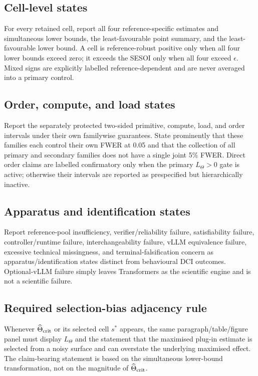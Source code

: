 \documentclass[11pt,a4paper]{article}
\begin{document}
\subsection{Cell-level states}
For every retained cell, report all four reference-specific estimates and simultaneous lower bounds, the least-favourable point summary, and the least-favourable lower bound. A cell is reference-robust positive only when all four lower bounds exceed zero; it exceeds the SESOI only when all four exceed $\epsilon$. Mixed signs are explicitly labelled reference-dependent and are never averaged into a primary control.

\subsection{Order, compute, and load states}
Report the separately protected two-sided primitive, compute, load, and order intervals under their own familywise guarantees. State prominently that these families each control their own FWER at 0.05 and that the collection of all primary and secondary families does not have a single joint 5\% FWER. Direct order claims are labelled confirmatory only when the primary $L_\Theta>0$ gate is active; otherwise their intervals are reported as prespecified but hierarchically inactive.

\subsection{Apparatus and identification states}
Report reference-pool insufficiency, verifier/reliability failure, satisfiability failure, controller/runtime failure, interchangeability failure, vLLM equivalence failure, excessive technical missingness, and terminal-falsification concern as apparatus/identification states distinct from behavioural DCI outcomes. Optional-vLLM failure simply leaves Transformers as the scientific engine and is not a scientific failure.

\subsection{Required selection-bias adjacency rule}
Whenever $\widehat\Theta_{\rm crit}$ or its selected cell $s^\ast$ appears, the same paragraph/table/figure panel must display $L_\Theta$ and the statement that the maximised plug-in estimate is selected from a noisy surface and can overstate the underlying maximised effect. The claim-bearing statement is based on the simultaneous lower-bound transformation, not on the magnitude of $\widehat\Theta_{\rm crit}$.
\end{document}
